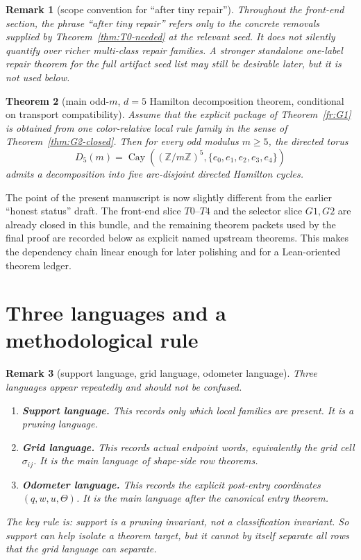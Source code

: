\documentclass[11pt]{article}
\newtheorem{theorem}{Theorem}[section]
\newtheorem{remark}[theorem]{Remark}
\newcommand{\Z}{\mathbb Z}
\newcommand{\sig}[2]{\sigma_{#1#2}}
\begin{document}
\begin{remark}[scope convention for ``after tiny repair'']
Throughout the front-end section, the phrase ``after tiny repair'' refers only
to the concrete removals supplied by Theorem~\ref{thm:T0-needed} at the relevant
seed.  It does not silently quantify over richer multi-class repair families.
A stronger standalone one-label repair theorem for the full artifact seed list
may still be desirable later, but it is not used below.
\end{remark}

\begin{theorem}[main odd-$m$, $d=5$ Hamilton decomposition theorem, conditional on transport compatibility]
\label{thm:conditional-full}
Assume that the explicit package of Theorem~\ref{fr:G1} is obtained from one
color-relative local rule family in the sense of
Theorem~\ref{thm:G2-closed}.
Then for every odd modulus $m\ge 5$, the directed torus
\[
D_5(m)=\operatorname{Cay}((\Z/m\Z)^5,\{e_0,e_1,e_2,e_3,e_4\})
\]
admits a decomposition into five arc-disjoint directed Hamilton cycles.
\end{theorem}

The point of the present manuscript is now slightly different from the earlier
``honest status'' draft.
The front-end slice $T0$--$T4$ and the selector slice $G1,G2$ are already
closed in this bundle, and the remaining theorem packets used by the final
proof are recorded below as explicit named upstream theorems.
This makes the dependency chain linear enough for later polishing and for a
Lean-oriented theorem ledger.

\section{Three languages and a methodological rule}

\begin{remark}[support language, grid language, odometer language]
Three languages appear repeatedly and should not be confused.
\begin{enumerate}[label=\textup{(\arabic*)},leftmargin=2.8em]
\item \textbf{Support language.}
      This records only which local families are present.
      It is a pruning language.
\item \textbf{Grid language.}
      This records actual endpoint words, equivalently the grid cell
      \(\sig{i}{j}\).
      It is the main language of shape-side row theorems.
\item \textbf{Odometer language.}
      This records the explicit post-entry coordinates
      \((q,w,u,\Theta)\).
      It is the main language after the canonical entry theorem.
\end{enumerate}
The key rule is:
\emph{support is a pruning invariant, not a classification invariant.}
So support can help isolate a theorem target, but it cannot by itself separate
all rows that the grid language can separate.
\end{remark}
\end{document}
